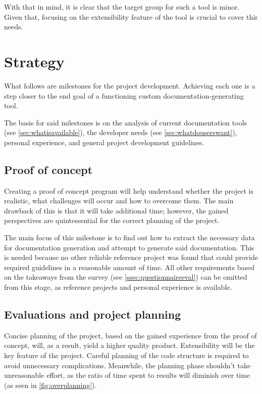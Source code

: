 With that in mind, it is clear that the target group for such a tool is minor. Given that, focusing on the extensibility feature of the tool is crucial to cover thir needs.

\section*{Strategy}

What follows are milestones for the project development.
Achieving each one is a step closer to the end goal of a functioning custom documentation-generating tool.

The basis for said milestones is on the analysis of current documentation tools (see \ref{sec:whatisavailable}), the developer needs (see \ref{sec:whatdouserswant}), personal experience, and general project development guidelines.

\subsection*{Proof of concept} \label{subSecProofOfConcept}

Creating a proof of concept program will help understand whether the project is realistic, what challenges will occur and how to overcome them.
The main drawback of this is that it will take additional time; however, the gained perspectives are quintessential for the correct planning of the project.

The main focus of this milestone is to find out how to extract the necessary data for documentation generation and attempt to generate said documentation.
This is needed because no other reliable reference project was found that could provide required guidelines in a reasonable amount of time.
All other requirements based on the takeaways from the survey (see \ref{ssec:questionnaireeval}) can be omitted from this stage, as reference projects and personal experience is available.

\subsection*{Evaluations and project planning} \label{subSecEvalProjPlanning}

Concise planning of the project, based on the gained experience from the proof of concept, will, as a result, yield a higher quality product.
Extensibility will be the key feature of the project. Careful planning of the code structure is required to avoid unnecessary complications.
Meanwhile, the planning phase shouldn't take unreasonable effort, as the ratio of time spent to results will diminish over time (as seen in \ref{fig:overplanning}). \cite{ruparelia_stop_2016}

